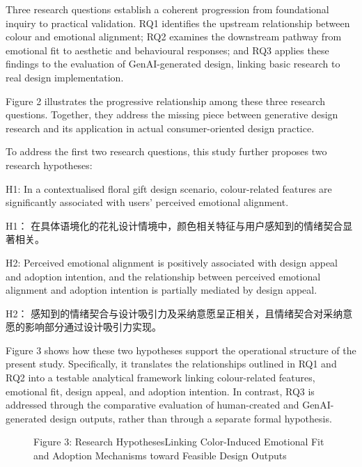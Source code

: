 Three research questions establish a coherent progression from foundational inquiry to practical validation. RQ1 identifies the upstream relationship between colour and emotional alignment; RQ2 examines the downstream pathway from emotional fit to aesthetic and behavioural responses; and RQ3 applies these findings to the evaluation of GenAI-generated design, linking basic research to real design implementation.

Figure 2 illustrates the progressive relationship among these three research questions. Together, they address the missing piece between generative design research and its application in actual consumer-oriented design practice.

To address the first two research questions, this study further proposes two research hypotheses:

H1: In a contextualised floral gift design scenario, colour-related features are significantly associated with users’ perceived emotional alignment.

H1： 在具体语境化的花礼设计情境中，颜色相关特征与用户感知到的情绪契合显著相关。

H2: Perceived emotional alignment is positively associated with design appeal and adoption intention, and the relationship between perceived emotional alignment and adoption intention is partially mediated by design appeal.

H2： 感知到的情绪契合与设计吸引力及采纳意愿呈正相关，且情绪契合对采纳意愿的影响部分通过设计吸引力实现。

Figure 3 shows how these two hypotheses support the operational structure of the present study. Specifically, it translates the relationships outlined in RQ1 and RQ2 into a testable analytical framework linking colour-related features, emotional fit, design appeal, and adoption intention. In contrast, RQ3 is addressed through the comparative evaluation of human-created and GenAI-generated design outputs, rather than through a separate formal hypothesis.

\begin{figure}[htbp]

  \centering



  \caption{Figure 3: Research HypothesesLinking Color-Induced Emotional Fit and Adoption Mechanisms toward Feasible Design Outputs}

  \label{fig:figure_3_research_hypotheseslinking_colo}

\end{figure}
